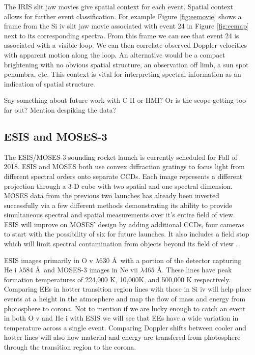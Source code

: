 \documentclass[]{aastex6}
\begin{document}
	The IRIS slit jaw movies give spatial context for each event.  Spatial context allows for further event classification. For example Figure \ref{fig:eemovie} shows a frame from the Si {\sc iv} slit jaw movie associated with event 24 in Figure \ref{fig:eemap} next to its corresponding spectra.  From this frame we can see that event 24 is associated with a visible loop.  We can then correlate observed Doppler velocities with apparent motion along the loop.  An alternative would be a compact brightening with no obvious spatial structure, an observation off limb, a sun spot penumbra, etc.  This context is vital for interpreting spectral information as an indication of spatial structure.
	
	Say something about future work with C II or HMI?  Or is the scope getting too far out?  Mention despiking the data?
	

	\subsection{ESIS and MOSES-3}
	The ESIS/MOSES-3 sounding rocket launch is currently scheduled for Fall of 2018.  ESIS and MOSES both use convex diffraction gratings to focus light from different spectral orders onto separate CCDs.  Each image represents a different projection through a 3-D cube with two spatial and one spectral dimension.  MOSES data from the previous two launches has already been inverted successfully via a few different methods \citep{Fox2010,Courrier2015,Smart2016,Smart2017,Rust2017} demonstrating its ability to provide simultaneous spectral and spatial measurements over it's entire field of view.  ESIS will improve on MOSES' design by adding additional CCDs, four cameras to start with the possibility of six for future launches.  It also includes a field stop which will limit spectral contamination from objects beyond its field of view \citep{Parker2016}.
	
	ESIS images primarily in O {\sc v} $\lambda 630$ \AA \ with a portion of the detector capturing He {\sc i} $\lambda 584$ \AA \ and MOSES-3 images in Ne {\sc vii} $\lambda 465$ \AA.  These lines have peak formation temperatures of 224,000 K, 10,000K, and 500,000 K respectively. Comparing EEs in hotter transition region lines with those in Si {\sc iv} will help place events at a height in the atmosphere and map the flow of mass and energy from photosphere to corona.  Not to mention if we are lucky enough to catch an event in both O {\sc v} and He {\sc i} with ESIS we will see that EEs have a wide variation in temperature across a single event.  Comparing Doppler shifts between cooler and hotter lines will also how material and energy are transfered from photosphere through the transition region to the corona.
	
\end{document}
